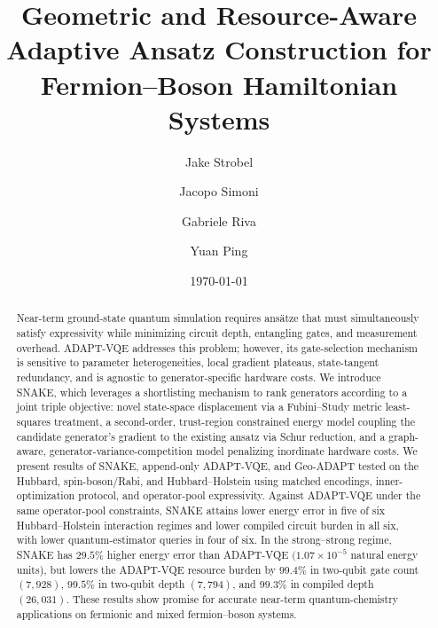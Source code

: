 \documentclass[
  reprint,
  amsmath,
  amssymb,
  aps,
  pra,
  nofootinbib,
  superscriptaddress,
  floatfix
]{revtex4-2}
\begin{document}
\makeatletter
\def\bibsection{\section*{\refname}\@nobreaktrue}
\makeatother

\title{Geometric and Resource-Aware Adaptive Ansatz Construction for Fermion--Boson Hamiltonian Systems}

\author{Jake Strobel}
\author{Jacopo Simoni}
\author{Gabriele Riva}
\author{Yuan Ping}

\date{\today}

\begin{abstract}
Near-term ground-state quantum simulation requires ansätze that must simultaneously satisfy expressivity while minimizing circuit depth, entangling gates, and measurement overhead. ADAPT-VQE addresses this problem; however, its gate-selection mechanism is sensitive to parameter heterogeneities, local gradient plateaus, state-tangent redundancy, and is agnostic to generator-specific hardware costs. We introduce SNAKE, which leverages a shortlisting mechanism to rank generators according to a joint triple objective: novel state-space displacement via a Fubini--Study metric least-squares treatment, a second-order, trust-region constrained energy model coupling the candidate generator's gradient to the existing ansatz via Schur reduction, and a graph-aware, generator-variance-competition model penalizing inordinate hardware costs. We present results of SNAKE, append-only ADAPT-VQE, and Geo-ADAPT tested on the Hubbard, spin-boson/Rabi, and Hubbard--Holstein using matched encodings, inner-optimization protocol, and operator-pool expressivity. Against ADAPT-VQE under the same operator-pool constraints, SNAKE attains lower energy error in five of six Hubbard--Holstein interaction regimes and lower compiled circuit burden in all six, with lower quantum-estimator queries in four of six. In the strong--strong regime, SNAKE has \(29.5\%\) higher energy error than ADAPT-VQE \((1.07\times10^{-5}\) natural energy units), but lowers the ADAPT-VQE resource burden by \(99.4\%\) in two-qubit gate count \((7{,}928)\), \(99.5\%\) in two-qubit depth \((7{,}794)\), and \(99.3\%\) in compiled depth \((26{,}031)\). These results show promise for accurate near-term quantum-chemistry applications on fermionic and mixed fermion--boson systems.


\end{abstract}

\maketitle
\end{document}
